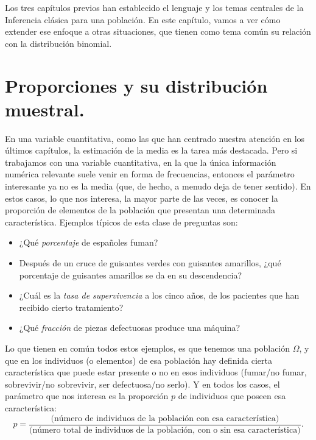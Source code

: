 
Los tres capítulos previos han establecido el lenguaje y los temas centrales de la Inferencia
clásica para una población. En este capítulo, vamos a ver cómo extender ese enfoque a otras
situaciones, que tienen como tema común su relación con la distribución binomial.

\section{Proporciones y su distribución muestral.}
\label{cap08:sec:ProporcionesDistribucionMuestral}

En una variable cuantitativa, como las que han centrado nuestra atención en los últimos capítulos,
la estimación de la media es la tarea más destacada. Pero si trabajamos con  una variable
cuantitativa, en la que la única información numérica relevante suele venir en forma de
frecuencias, entonces el parámetro interesante ya no es la media (que, de hecho, a menudo deja de
tener sentido). En estos casos, lo que nos interesa, la mayor parte de las veces, es conocer la
{\sf proporción} de elementos de la población que presentan una determinada característica.
Ejemplos típicos de esta clase de preguntas son:
\begin{itemize}
  \item ¿Qué {\em porcentaje} de españoles fuman?
  \item Después de un cruce de guisantes verdes con guisantes amarillos, ¿qué porcentaje de
      guisantes amarillos se da en su descendencia?
  \item ¿Cuál es la {\em tasa de supervivencia} a los cinco años, de los pacientes que han
      recibido cierto tratamiento?
  \item ¿Qué {\em fracción} de piezas defectuosas produce una máquina?
\end{itemize}

Lo que tienen en común todos estos ejemplos, es que tenemos una población $\Omega$, y que en los
individuos (o elementos) de esa población hay definida cierta característica que puede estar
presente o no en esos individuos (fumar/no fumar, sobrevivir/no sobrevivir, ser defectuosa/no
serlo).  Y en todos los casos, el parámetro que nos interesa es la {\sf proporción} $p$ de
individuos que poseen esa característica:
    \[p=\dfrac{\mbox{(número de individuos de la población con esa característica)}}{
    \mbox{(número total de individuos de la población, con o sin esa característica)}}.\]

